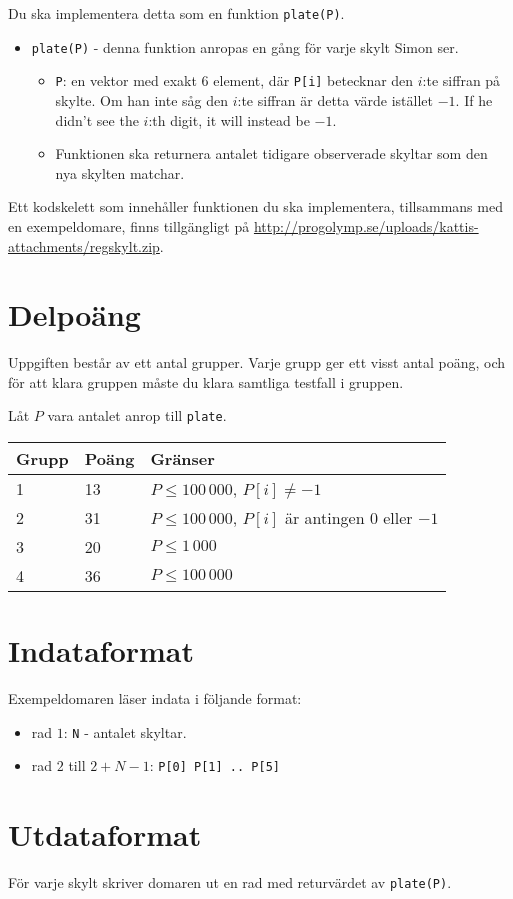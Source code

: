 Du ska implementera detta som en funktion \texttt{plate(P)}.
\begin{itemize}
  \item \texttt{plate(P)} - denna funktion anropas en gång för varje skylt Simon ser.
  \begin{itemize}
    \item \texttt{P}: en vektor med exakt 6 element, där \texttt{P[i]} betecknar den $i$:te siffran på skylte.
      Om han inte såg den $i$:te siffran är detta värde istället $-1$.
      If he didn't see the $i$:th digit, it will instead be $-1$.
    \item Funktionen ska returnera antalet tidigare observerade skyltar som den nya skylten matchar.
  \end{itemize}
\end{itemize}

Ett kodskelett som innehåller funktionen du ska implementera, tillsammans med en exempeldomare, finns tillgängligt på
\url{http://progolymp.se/uploads/kattis-attachments/regskylt.zip}.

\section*{Delpoäng}
Uppgiften består av ett antal grupper. Varje grupp ger ett visst antal poäng, och för att klara
gruppen måste du klara samtliga testfall i gruppen.

Låt $P$ vara antalet anrop till \texttt{plate}.

\begin{tabular}{|l|l|l|}
  \hline
  \textbf{Grupp} & \textbf{Poäng} & \textbf{Gränser} \\ \hline
  1 & 13 & $P \le 100\,000$, $P[i] \not= -1$ \\ \hline
  2 & 31 & $P \le 100\,000$, $P[i]$ är antingen $0$ eller $-1$ \\ \hline
  3 & 20 & $P \le 1\,000$ \\ \hline
  4 & 36 & $P \le 100\,000$ \\ \hline
\end{tabular}


\section*{Indataformat}
Exempeldomaren läser indata i följande format:

\begin{itemize}
  \item rad $1$: \texttt{N} - antalet skyltar.
  \item rad $2$ till $2 + N - 1$: \texttt{P[0] P[1] .. P[5]}
\end{itemize}

\section*{Utdataformat}
För varje skylt skriver domaren ut en rad med returvärdet av \texttt{plate(P)}.
